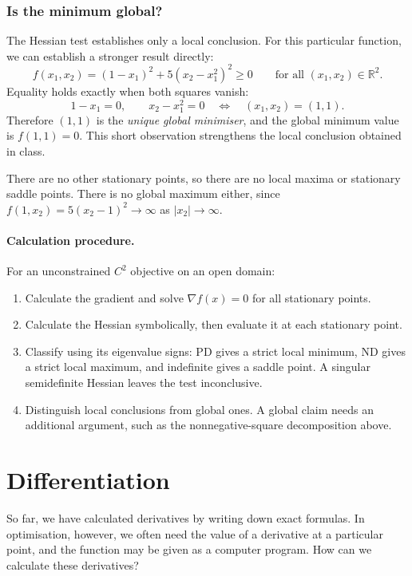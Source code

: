 \subsubsection*{Is the minimum global?}
The Hessian test establishes only a local conclusion. For this particular function, we can establish a stronger result directly:
\[
 f(x_1,x_2)=(1-x_1)^2+5(x_2-x_1^2)^2\ge0
 \qquad\text{for all }(x_1,x_2)\in\mathbb{R}^2.
\]
Equality holds exactly when both squares vanish:
\[
 1-x_1=0,\qquad x_2-x_1^2=0
 \quad\Longleftrightarrow\quad (x_1,x_2)=(1,1).
\]
Therefore $(1,1)$ is the \emph{unique global minimiser}, and the global minimum value is $f(1,1)=0$. This short observation strengthens the local conclusion obtained in class.

There are no other stationary points, so there are no local maxima or stationary saddle points. There is no global maximum either, since $f(1,x_2)=5(x_2-1)^2\to\infty$ as $|x_2|\to\infty$.

\paragraph{Calculation procedure.}
For an unconstrained $C^2$ objective on an open domain:
\begin{enumerate}
 \item Calculate the gradient and solve $\nabla f(x)=0$ for all stationary points.
 \item Calculate the Hessian symbolically, then evaluate it at each stationary point.
 \item Classify using its eigenvalue signs: PD gives a strict local minimum, ND gives a strict local maximum, and indefinite gives a saddle point. A singular semidefinite Hessian leaves the test inconclusive.
 \item Distinguish local conclusions from global ones. A global claim needs an additional argument, such as the nonnegative-square decomposition above.
\end{enumerate}


\clearpage
\section{Differentiation}
\label{sec:lec07-differentiation}
So far, we have calculated derivatives by writing down exact formulas. In optimisation, however, we often need the value of a derivative at a particular point, and the function may be given as a computer program. How can we calculate these derivatives?

